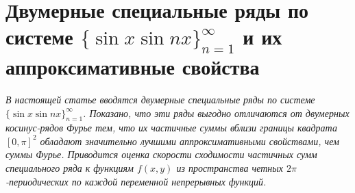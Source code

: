 \section{Двумерные  специальные ряды по системе $\{\sin x\sin nx\}_{n=1}^\infty$  и их аппроксимативные свойства}\label{sect-2.3}

\textit{В настоящей статье вводятся двумерные специальные ряды по системе \linebreak $\{\sin x\sin nx\}_{n=1}^\infty$.
Показано, что эти ряды выгодно отличаются от двумерных косинус-рядов Фурье тем, что их частичные суммы вблизи границы квадрата $[0,\pi]^2$ обладают значительно лучшими аппроксимативными свойствами, чем суммы Фурье. Приводится оценка скорости сходимости частичных сумм специального ряда к функциям $f(x,y)$ из пространства четных $2\pi$-периодических по каждой переменной непрерывных функций.}


